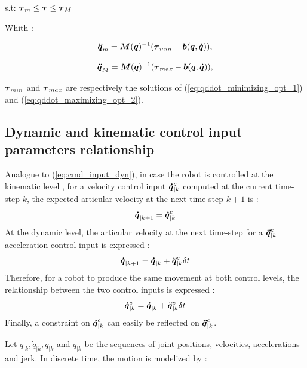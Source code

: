 \documentclass[a4paper, 10pt, conference]{ieeeconf}      %
\newcommand{\vect}[1]{\mbox{\boldmath${#1}$}}%
\begin{document}
{{s.t: $\vect{\tau}_m \leq \vect{\tau} \leq \vect{\tau}_M$

Whith : 

\begin{equation}
\vect{\ddot{q}}_m =  \boldsymbol{M}(\vect{q})^{-1} (\vect{\tau}_{min}-\vect{b}(\vect{q},\vect{\dot{q}})), 
\label{eq:qddot_minimizing}
\end{equation}

\begin{equation}
\vect{\ddot{q}}_M =  \boldsymbol{M}(\vect{q})^{-1} (\vect{\tau}_{max}-\vect{b}(\vect{q},\vect{\dot{q}})), 
\label{eq:qddot_maximizing}
\end{equation}

$\vect{\tau}_{min}$ and $\vect{\tau}_{max}$ are respectively the solutions of (\ref{eq:qddot_minimizing_opt_1}) and (\ref{eq:qddot_maximizing_opt_2}). 



\subsection{Dynamic and kinematic control input parameters relationship}
Analogue to (\ref{eq:cmd_input_dyn}), in case the robot is controlled at the kinematic level , for a velocity control input $\vect{\dot{q}}_{|k}^{c}$ computed at the current time-step $k$, the expected articular velocity at the next time-step $k+1$ is : 
\begin{equation} 
\vect{\dot{q}}_{|k+1} =\vect{\dot{q}}_{|k}^{c} 
\label{eq:cmd_input_kin}
\end{equation}
At the dynamic level, the articular velocity at the next time-step for a $\vect{\ddot{q}}_{|k}^{c}$ acceleration control input is expressed : 
\begin{equation} 
\vect{\dot{q}}_{|k+1}=\vect{\dot{q}}_{|k}+\vect{\ddot{q}}_{|k}^{c} \delta t
\label{eq:cmd_input_dyn2}
\end{equation}
Therefore, for a robot to produce the same movement at both control levels, the relationship between the two control inputs is expressed : 
\begin{equation} 
\vect{\dot{q}}_{|k}^{c}=\vect{\dot{q}}_{|k}+\vect{\ddot{q}}_{|k}^{c} \delta t
\label{eq:kin_dyn_ctrl_inp_rela}
\end{equation}
Finally, a constraint on $\vect{\dot{q}}_{|k}^{c}$ can easily be reflected on $\vect{\ddot{q}}_{|k}^{c}$.



Let $q_{|k}, \dot{q}_{|k}, \ddot{q}_{|k}$ and $\dddot{q}_{|k}$ be the sequences of joint positions, velocities, accelerations and jerk. In discrete time, the motion is modelized by : 

}}
\end{document}
